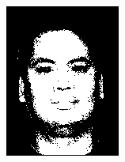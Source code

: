 \begin{figure}[h]
\begin{subfigure}[b]{0.18\textwidth}
         \includegraphics[width=\textwidth]{images/results/base_st/dd121.color.d3_dyc.png}
     \end{subfigure}
     \begin{subfigure}[b]{0.18\textwidth}
         \centering

\end{subfigure}
\end{figure}
